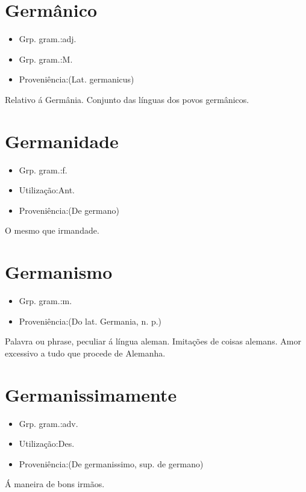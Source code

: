 \section{Germânico}
\begin{itemize}
\item {Grp. gram.:adj.}
\end{itemize}
\begin{itemize}
\item {Grp. gram.:M.}
\end{itemize}
\begin{itemize}
\item {Proveniência:(Lat. \textunderscore germanicus\textunderscore )}
\end{itemize}
Relativo á Germânia.
Conjunto das línguas dos povos germânicos.
\section{Germanidade}
\begin{itemize}
\item {Grp. gram.:f.}
\end{itemize}
\begin{itemize}
\item {Utilização:Ant.}
\end{itemize}
\begin{itemize}
\item {Proveniência:(De \textunderscore germano\textunderscore )}
\end{itemize}
O mesmo que \textunderscore irmandade\textunderscore .
\section{Germanismo}
\begin{itemize}
\item {Grp. gram.:m.}
\end{itemize}
\begin{itemize}
\item {Proveniência:(Do lat. \textunderscore Germania\textunderscore , n. p.)}
\end{itemize}
Palavra ou phrase, peculiar á língua aleman.
Imitações de coisas alemans.
Amor excessivo a tudo que procede de Alemanha.
\section{Germanissimamente}
\begin{itemize}
\item {Grp. gram.:adv.}
\end{itemize}
\begin{itemize}
\item {Utilização:Des.}
\end{itemize}
\begin{itemize}
\item {Proveniência:(De \textunderscore germanissimo\textunderscore , sup. de \textunderscore germano\textunderscore )}
\end{itemize}
Á maneira de bons irmãos.
